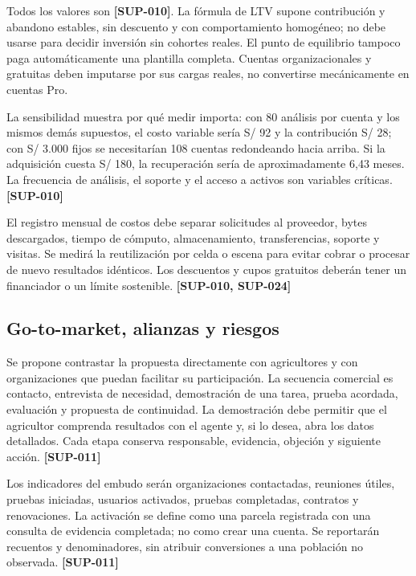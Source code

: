 \documentclass[10pt,a4paper]{article}
\begin{document}
Todos los valores son \textbf{[SUP-010]}. La fórmula de LTV supone contribución y abandono estables, sin descuento y con comportamiento homogéneo; no debe usarse para decidir inversión sin cohortes reales. El punto de equilibrio tampoco paga automáticamente una plantilla completa. Cuentas organizacionales y gratuitas deben imputarse por sus cargas reales, no convertirse mecánicamente en cuentas Pro.


La sensibilidad muestra por qué medir importa: con 80 análisis por cuenta y los mismos demás supuestos, el costo variable sería S/\allowbreak{} 92 y la contribución S/\allowbreak{} 28; con S/\allowbreak{} 3.000 fijos se necesitarían 108 cuentas redondeando hacia arriba. Si la adquisición cuesta S/\allowbreak{} 180, la recuperación sería de aproximadamente 6,43 meses. La frecuencia de análisis, el soporte y el acceso a activos son variables críticas. \textbf{[SUP-010]}


El registro mensual de costos debe separar solicitudes al proveedor, bytes descargados, tiempo de cómputo, almacenamiento, transferencias, soporte y visitas. Se medirá la reutilización por celda o escena para evitar cobrar o procesar de nuevo resultados idénticos. Los descuentos y cupos gratuitos deberán tener un financiador o un límite sostenible. \textbf{[SUP-010, SUP-024]}


\subsection{Go-to-market, alianzas y riesgos}

Se propone contrastar la propuesta directamente con agricultores y con organizaciones que puedan facilitar su participación. La secuencia comercial es contacto, entrevista de necesidad, demostración de una tarea, prueba acordada, evaluación y propuesta de continuidad. La demostración debe permitir que el agricultor comprenda resultados con el agente y, si lo desea, abra los datos detallados. Cada etapa conserva responsable, evidencia, objeción y siguiente acción. \textbf{[SUP-011]}


Los indicadores del embudo serán organizaciones contactadas, reuniones útiles, pruebas iniciadas, usuarios activados, pruebas completadas, contratos y renovaciones. La activación se define como una parcela registrada con una consulta de evidencia completada; no como crear una cuenta. Se reportarán recuentos y denominadores, sin atribuir conversiones a una población no observada. \textbf{[SUP-011]}
\end{document}
